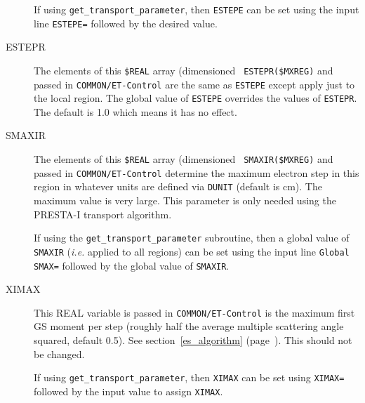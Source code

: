 \begin{description}
If using {\tt get\_transport\_parameter}, then {\tt ESTEPE} can be set using
the input line {\tt ESTEPE=} followed by the desired value.

\item[ESTEPR] The elements of this {\tt \$REAL} array (dimensioned {\tt
ESTEPR(\$MXREG)} and passed in {\tt COMMON/ET-Control}  are the same as
{\tt ESTEPE} except apply just to the local region. The global value of
{\tt ESTEPE}
overrides the values of {\tt ESTEPR}. The default is 1.0 which
means it has no effect.

\item[SMAXIR] The elements of this {\tt \$REAL} array (dimensioned {\tt
SMAXIR(\$MXREG)} and passed in {\tt COMMON/ET-Control} determine the
maximum electron step in this region in whatever units are defined via
{\tt DUNIT} (default is cm). The maximum value is very large. This parameter is
only needed using the PRESTA-I transport algorithm.

If using the {\tt get\_transport\_parameter} subroutine, then a global value of
{\tt SMAXIR} ({\em i.e.} applied to all regions) can be set using the input
line {\tt Global SMAX=} followed by the global value of {\tt SMAXIR}.

\item[XIMAX] This REAL variable is passed in {\tt COMMON/ET-Control} is the
maximum first GS moment per step (roughly half the average multiple
scattering angle squared,  default 0.5). See section~\ref{es_algorithm}
(page~\pageref{es_algorithm}). This should not be changed.

If using {\tt get\_transport\_parameter}, then {\tt XIMAX} can be set using
{\tt XIMAX= } followed by the input value to assign {\tt XIMAX}.

\end{description}

